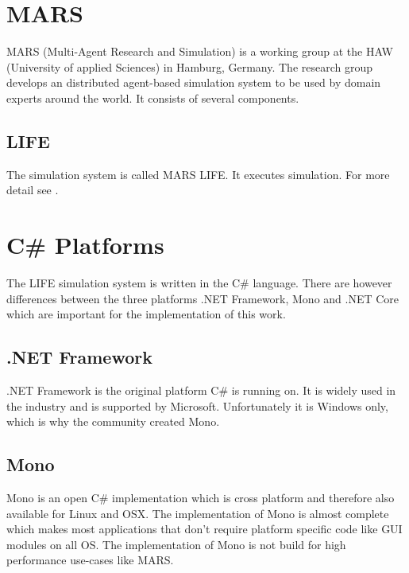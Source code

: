 \section{MARS}
MARS (Multi-Agent Research and Simulation) is a working group at the HAW (University of applied Sciences) in Hamburg, Germany. The research group develops an distributed agent-based simulation system \citep{Wooldridge2009} to be used by domain experts around the world. It consists of several components.


\subsection{LIFE}
The simulation system is called MARS LIFE. It executes simulation. For more detail see \cite{Huning2016}.


%
%



\section{C\# Platforms}
The LIFE simulation system is written in the C\# language. There are however differences between the three platforms .NET Framework, Mono and .NET Core which are important for the implementation of this work.


\subsection{.NET Framework}
.NET Framework is the original platform C\# is running on. It is widely used in the industry and is supported by Microsoft. Unfortunately it is Windows only, which is why the community created Mono.

\subsection{Mono}
Mono is an open C\# implementation which is cross platform and therefore also available for Linux and OSX. The implementation of Mono is almost complete which makes most applications that don't require platform specific code like GUI modules on all OS. The implementation of Mono is not build for high performance use-cases like MARS.

